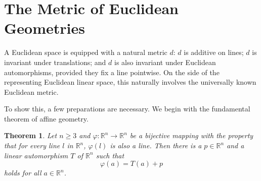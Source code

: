 \documentclass[11pt,a4paper]{article}
\newtheorem{theorem}{Theorem}[section]
\begin{document}
\section{The Metric of Euclidean Geometries}

A Euclidean space is equipped with a natural metric $d$: $d$ is additive on lines; $d$ is invariant under translations; and $d$ is also invariant under Euclidean automorphisms, provided they fix a line pointwise. On the side of the representing Euclidean linear space, this naturally involves the universally known Euclidean metric.

To show this, a few preparations are necessary. We begin with the fundamental theorem of affine geometry.

\begin{theorem} \label{thm:fundamental_affine}
Let $n \ge 3$ and $\varphi: \mathbb{R}^n \to \mathbb{R}^n$ be a bijective mapping with the property that for every line $l$ in $\mathbb{R}^n$, $\varphi(l)$ is also a line. Then there is a $p \in \mathbb{R}^n$ and a linear automorphism $T$ of $\mathbb{R}^n$ such that
\[ \varphi(a) = T(a) + p \]
holds for all $a \in \mathbb{R}^n$.
\end{theorem}
\end{document}
